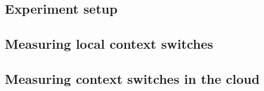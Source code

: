  
\subsection{Experiment setup}

\subsection{Measuring local context switches}




\subsection{Measuring context switches in the cloud}
